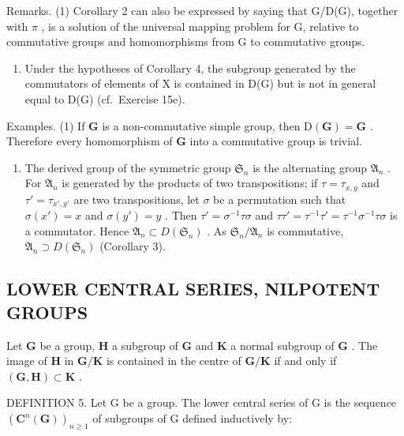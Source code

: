Remarks. (1) Corollary 2 can also be expressed by saying that G/D(G), together with \(\pi\) , is a solution of the universal mapping problem for G, relative to commutative groups and homomorphisms from G to commutative groups.

\begin{enumerate}
\def\labelenumi{(\arabic{enumi})}
\setcounter{enumi}{1}
\tightlist
\item
  Under the hypotheses of Corollary 4, the subgroup generated by the commutators of elements of X is contained in D(G) but is not in general equal to D(G) (cf.~Exercise 15e).
\end{enumerate}

Examples. (1) If \(\mathbf{G}\) is a non-commutative simple group, then \(\mathrm{D}(\mathbf{G}) = \mathbf{G}\) . Therefore every homomorphism of \(\mathbf{G}\) into a commutative group is trivial.

\begin{enumerate}
\def\labelenumi{(\arabic{enumi})}
\setcounter{enumi}{1}
\tightlist
\item
  The derived group of the symmetric group \(\mathfrak{S}_n\) is the alternating group \(\mathfrak{A}_n\) . For \(\mathfrak{A}_n\) is generated by the products of two transpositions; if \(\tau = \tau_{x,y}\) and \(\tau' = \tau_{x',y'}\) are two transpositions, let \(\sigma\) be a permutation such that \(\sigma(x') = x\) and \(\sigma(y') = y\) . Then \(\tau' = \sigma^{-1}\tau\sigma\) and \(\tau\tau' = \tau^{-1}\tau' = \tau^{-1}\sigma^{-1}\tau\sigma\) is a commutator. Hence \(\mathfrak{A}_n \subset D(\mathfrak{S}_n)\) . As \(\mathfrak{S}_n / \mathfrak{A}_n\) is commutative, \(\mathfrak{A}_n \supset D(\mathfrak{S}_n)\) (Corollary 3).
\end{enumerate}

\subsection{LOWER CENTRAL SERIES, NILPOTENT GROUPS}

Let \(\mathbf{G}\) be a group, \(\mathbf{H}\) a subgroup of \(\mathbf{G}\) and \(\mathbf{K}\) a normal subgroup of \(\mathbf{G}\) . The image of \(\mathbf{H}\) in \(\mathbf{G} / \mathbf{K}\) is contained in the centre of \(\mathbf{G} / \mathbf{K}\) if and only if \((\mathbf{G}, \mathbf{H}) \subset \mathbf{K}\) .

DEFINITION 5. Let G be a group. The lower central series of G is the sequence \((\mathbf{C}^n (\mathbf{G}))_{n\geqslant 1}\) of subgroups of G defined inductively by:

